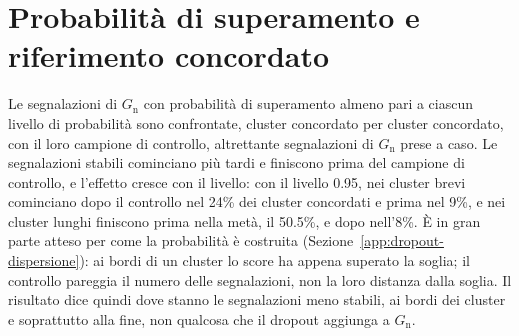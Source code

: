 \section{Probabilità di superamento e riferimento concordato}
\label{app:dropout-concordate}

Le segnalazioni di $G_{\mathrm{n}}$ con probabilità di superamento almeno pari a ciascun livello di probabilità sono confrontate, cluster concordato per cluster concordato, con il loro campione di controllo, altrettante segnalazioni di $G_{\mathrm{n}}$ prese a caso. Le segnalazioni stabili cominciano più tardi e finiscono prima del campione di controllo, e l'effetto cresce con il livello: con il livello 0.95, nei cluster brevi cominciano dopo il controllo nel 24\% dei cluster concordati e prima nel 9\%, e nei cluster lunghi finiscono prima nella metà, il 50.5\%, e dopo nell'8\%. È in gran parte atteso per come la probabilità è costruita (Sezione~\ref{app:dropout-dispersione}): ai bordi di un cluster lo score ha appena superato la soglia; il controllo pareggia il numero delle segnalazioni, non la loro distanza dalla soglia. Il risultato dice quindi dove stanno le segnalazioni meno stabili, ai bordi dei cluster e soprattutto alla fine, non qualcosa che il dropout aggiunga a $G_{\mathrm{n}}$.


